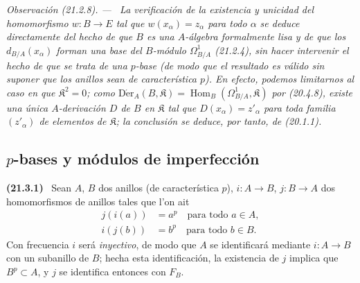 \documentclass[10pt,oneside]{book}
\makeatletter
\newcommand{\setmanualcurrentlabel}[1]{\def\@currentlabel{#1}}
\newenvironment{env}[1][]{\setmanualcurrentlabel{#1}\par\medskip\noindent\textbf{(#1)}\ }{\par}
\newenvironment{remark}[1][]{%
  \setmanualcurrentlabel{#1}\par\medskip\noindent\itshape Observación (#1). ---\ }{\par}
\makeatother
\begin{document}
\begin{remark}[21.2.8]
\label{0.21.2.8-es}
La verificación de la existencia y unicidad del homomorfismo $w:B\to E$ tal
que $w(x_\alpha)=z_\alpha$ para todo $\alpha$ se deduce directamente del
hecho de que $B$ es una $A$-álgebra formalmente lisa y de que los
$d_{B/A}(x_\alpha)$ forman una base del $B$-módulo $\Omega^1_{B/A}$ (21.2.4),
sin hacer intervenir el hecho de que se trata de una $p$-base (de modo que el
resultado es válido sin suponer que los anillos sean de característica $p$).
En efecto, podemos limitarnos al caso en que $\mathfrak K^2=0$; como
$\operatorname{D\acute{e}r}_A(B,\mathfrak K)=\operatorname{Hom}_B(\Omega^1_{B/A},\mathfrak K)$
por (20.4.8), existe una única $A$-derivación $D$ de $B$ en $\mathfrak K$ tal que
$D(x_\alpha)=z'_\alpha$ para toda familia $(z'_\alpha)$ de elementos de
$\mathfrak K$; la conclusión se deduce, por tanto, de (20.1.1).
\end{remark}

\subsection{$p$-bases y módulos de imperfección}
\label{0.21.3-es}

\begin{env}[21.3.1]
\label{0.21.3.1-es}
Sean $A$, $B$ dos anillos (de característica $p$), $i:A\to B$,
$j:B\to A$ dos homomorfismos de anillos tales que l'on ait
\begin{align}
\tag{21.3.1.1}\label{0.21.3.1.1-es}
j(i(a))&=a^p\quad\text{para todo }a\in A,\\
\tag{21.3.1.2}\label{0.21.3.1.2-es}
i(j(b))&=b^p\quad\text{para todo }b\in B.
\end{align}
Con frecuencia $i$ será \emph{inyectivo}, de modo que $A$ se identificará mediante
$i:A\to B$ con un subanillo de $B$; hecha esta identificación, la existencia
de $j$ implica que $B^p\subset A$, y $j$ se identifica entonces con $F_B$.
\end{env}
\end{document}
